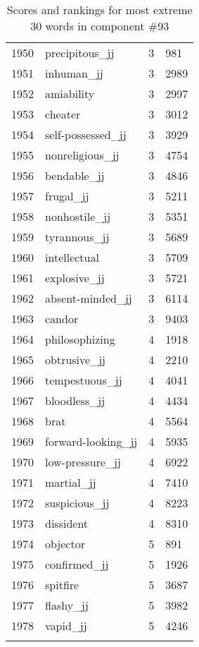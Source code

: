 \begin{longtable}[!htbp]{| rlr@{.}l |}
    1950 & precipitous\_jj & 3 & 981 \\
    1951 & inhuman\_jj & 3 & 2989 \\
    1952 & amiability & 3 & 2997 \\
    1953 & cheater & 3 & 3012 \\
    1954 & self-possessed\_jj & 3 & 3929 \\
    1955 & nonreligious\_jj & 3 & 4754 \\
    1956 & bendable\_jj & 3 & 4846 \\
    1957 & frugal\_jj & 3 & 5211 \\
    1958 & nonhostile\_jj & 3 & 5351 \\
    1959 & tyrannous\_jj & 3 & 5689 \\
    1960 & intellectual & 3 & 5709 \\
    1961 & explosive\_jj & 3 & 5721 \\
    1962 & absent-minded\_jj & 3 & 6114 \\
    1963 & candor & 3 & 9403 \\
    1964 & philosophizing & 4 & 1918 \\
    1965 & obtrusive\_jj & 4 & 2210 \\
    1966 & tempestuous\_jj & 4 & 4041 \\
    1967 & bloodless\_jj & 4 & 4434 \\
    1968 & brat & 4 & 5564 \\
    1969 & forward-looking\_jj & 4 & 5935 \\
    1970 & low-pressure\_jj & 4 & 6922 \\
    1971 & martial\_jj & 4 & 7410 \\
    1972 & suspicious\_jj & 4 & 8223 \\
    1973 & dissident & 4 & 8310 \\
    1974 & objector & 5 & 891 \\
    1975 & confirmed\_jj & 5 & 1926 \\
    1976 & spitfire & 5 & 3687 \\
    1977 & flashy\_jj & 5 & 3982 \\
    1978 & vapid\_jj & 5 & 4246 \\
    \hline
    \caption{Scores and rankings for most extreme 30 words in component \#93} \\
\end{longtable}
